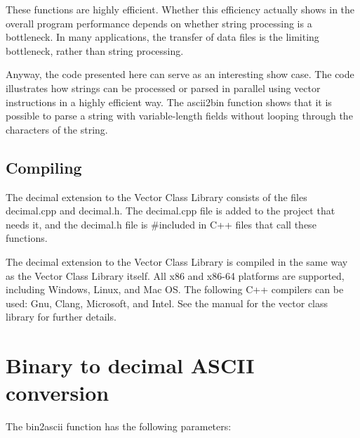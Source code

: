 \documentclass[11pt,a4paper,oneside,openright]{report}
\newcommand{\vspacesmall}{\vspace{3mm}}
\begin{document}
These functions are highly efficient. Whether this efficiency actually shows in the overall program performance depends on whether string processing is a bottleneck. In many applications, the transfer of data files is the limiting bottleneck, rather than string processing. 
\vspacesmall

Anyway, the code presented here can serve as an interesting show case. The code illustrates how strings can be processed or parsed in parallel using vector instructions in a highly efficient way. The ascii2bin function shows that it is possible to parse a string with variable-length fields without looping through the characters of the string.
\vspacesmall


\section{Compiling} \label{Compiling}
The decimal extension to the Vector Class Library consists of the files decimal.cpp and decimal.h. The decimal.cpp file is added to the project that needs it, and the decimal.h file is \#included in C++ files that call these functions.
\vspacesmall

The decimal extension to the Vector Class Library is compiled in the same way as the Vector Class Library itself. All x86 and x86-64 platforms are supported, including Windows, Linux, and Mac OS. 
The following C++ compilers can be used: Gnu, Clang, Microsoft, and Intel. 
See the manual for the vector class library for further details.


\chapter{Binary to decimal ASCII conversion}\label{chap:b2aConversion}

The bin2ascii function has the following parameters:
\end{document}
